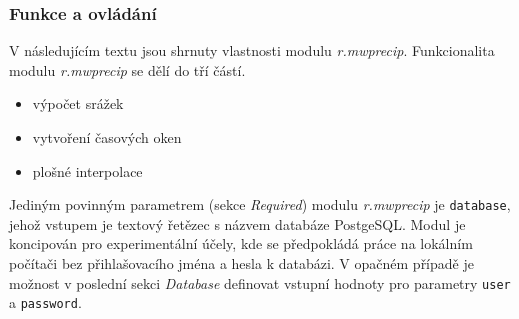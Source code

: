 \documentclass[a4paper,12pt,oneside]{report}
\begin{document}
 
\subsubsection{Funkce a ovládání}
V následujícím textu jsou shrnuty vlastnosti modulu
\textit{r.mwprecip}. Funkcionalita modulu \textit{r.mwprecip} se dělí
do tří částí.

\begin{itemize}
\item výpočet srážek
\item vytvoření časových oken
\item plošné interpolace 
\end{itemize}

Jediným povinným parametrem (sekce \textit{Required}) modulu
\textit{r.mwprecip} je \texttt{database}, jehož vstupem je textový
řetězec s názvem databáze PostgeSQL. Modul je koncipován pro
experimentální účely, kde se předpokládá práce na lokálním počítači
bez přihlašovacího jména a hesla k databázi. V opačném případě je
možnost v poslední sekci \textit{Database} definovat vstupní hodnoty
pro parametry \texttt{user} a \texttt{password}.
\end{document}
